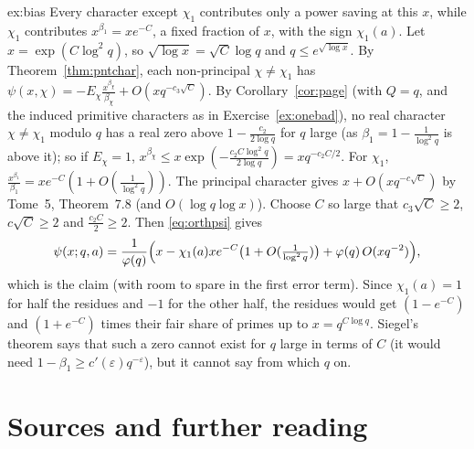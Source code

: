 \begin{solution}{ex:bias}
\idea Every character except $\chi_1$ contributes only a power saving at this $x$, while $\chi_1$ contributes $x^{\beta_1}=xe^{-C}$, a fixed fraction of $x$, with the sign $\chi_1(a)$.
\writeup Let $x=\exp(C\log^2q)$, so $\sqrt{\log x}=\sqrt C\log q$ and $q\le e^{\sqrt{\log x}}$. By Theorem~\ref{thm:pntchar}, each non-principal $\chi\ne\chi_1$ has $\psi(x,\chi)=-E_\chi\frac{x^{\beta_\chi}}{\beta_\chi}+O(xq^{-c_3\sqrt C})$. By Corollary~\ref{cor:page} (with $Q=q$, and the induced primitive characters as in Exercise~\ref{ex:onebad}), no real character $\chi\ne\chi_1$ modulo $q$ has a real zero above
$1-\frac{c_2}{2\log q}$ for $q$ large (as $\beta_1=1-\frac1{\log^2q}$ is above it); so if $E_\chi=1$, $x^{\beta_\chi}\le x\exp(-\frac{c_2C\log^2q}{2\log q})=xq^{-c_2C/2}$. For $\chi_1$, $\frac{x^{\beta_1}}{\beta_1}=x e^{-C}(1+O(\frac1{\log^2q}))$. The principal character gives $x+O(xq^{-c\sqrt C})$ by Tome~5, Theorem~7.8 (and $O(\log q\log x)$). Choose $C$ so large that
$c_3\sqrt C\ge2$, $c\sqrt C\ge2$ and $\frac{c_2C}2\ge2$. Then \eqref{eq:orthpsi} gives
\[
\psi(x;q,a)=\frac1{\varphi(q)}\Bigl(x-\chi_1(a)xe^{-C}\bigl(1+O(\tfrac1{\log^2q})\bigr)+\varphi(q)\,O(xq^{-2})\Bigr),
\]
which is the claim (with room to spare in the first error term). Since $\chi_1(a)=1$ for half the residues and $-1$ for the other half, the residues would get $(1-e^{-C})$ and $(1+e^{-C})$ times their fair share of primes up to $x=q^{C\log q}$. Siegel's theorem says that such a zero cannot exist for $q$ large in terms of $C$ (it would need $1-\beta_1\ge c'(\varepsilon)q^{-\varepsilon}$), but it cannot say from which $q$ on.
\end{solution}

\section*{Sources and further reading}

